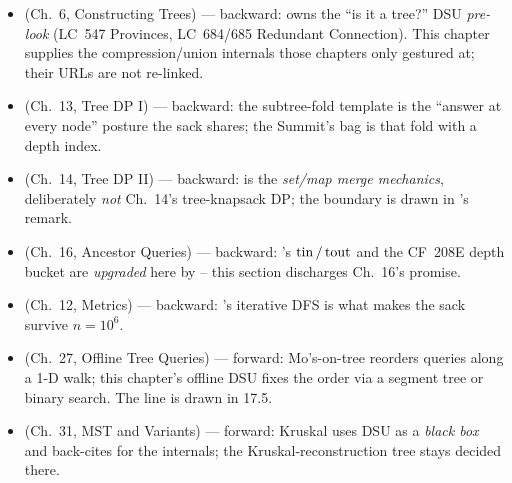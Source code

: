 \begin{itemize}[nosep, leftmargin=1.4em]
  \item {} (Ch.~6, Constructing Trees) --- backward: owns the
        ``is it a tree?'' DSU \emph{pre-look} (LC~547 Provinces, LC~684/685
        Redundant Connection). This chapter supplies the compression/union
        internals those chapters only gestured at; their URLs are not re-linked.
  \item {} (Ch.~13, Tree DP I) --- backward: the subtree-fold template
         is the ``answer at every node'' posture the
        sack shares; the Summit's bag is that fold with a depth index.
  \item {} (Ch.~14, Tree DP II) --- backward:  is the
        \emph{set/map merge mechanics}, deliberately \emph{not} Ch.~14's
        tree-knapsack DP; the boundary is drawn in 's remark.
  \item {} (Ch.~16, Ancestor Queries) --- backward: 's
        \(\operatorname{tin}/\operatorname{tout}\) and the CF~208E depth bucket are \emph{upgraded} here by
         -- this section discharges Ch.~16's promise.
  \item {} (Ch.~12, Metrics) --- backward: 's
        iterative DFS is what makes the sack survive \(n=10^6\).
  \item {} (Ch.~27, Offline Tree Queries) --- forward: Mo's-on-tree
        reorders queries along a 1-D walk; this chapter's offline DSU fixes the
        order via a segment tree or binary search. The line is drawn in 17.5.
  \item {} (Ch.~31, MST and Variants) --- forward: Kruskal uses DSU as a
        \emph{black box} and back-cites  for the internals; the
        Kruskal-reconstruction tree stays decided there.
\end{itemize}

